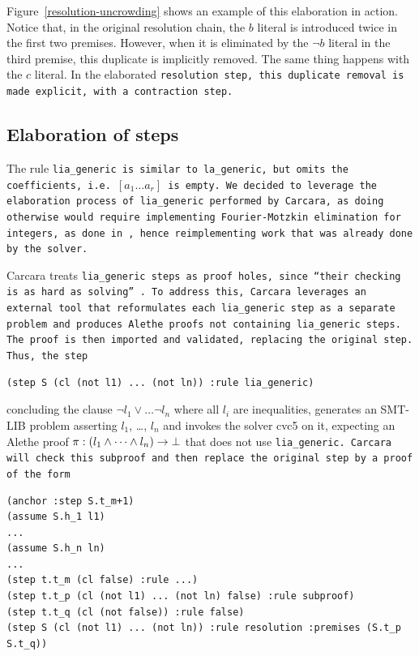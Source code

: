 Figure~\ref{resolution-uncrowding} shows an example of this elaboration in action.
Notice that, in the original resolution chain, the $b$ literal is introduced twice in the first two premises.
However, when it is eliminated by the $\neg b$ literal in the third premise, this duplicate is implicitly removed.
The same thing happens with the $c$ literal. In the elaborated \tt{resolution} step, this duplicate removal is made explicit, with a \tt{contraction} step.



\subsection{Elaboration of  steps}
\label{ssec:elaboration-lia}

The rule \tt{lia\_generic} is similar to \tt{la\_generic}, but omits the coefficients,
i.e.\ \colorbox{rxpink!30}{$[a_1 \dots a_r]$} is empty.
We decided to leverage the elaboration process of \tt{lia\_generic} performed by Carcara, as doing otherwise would require implementing Fourier-Motzkin elimination for integers, as done in \cite{micromega,omegatest}, hence reimplementing work that was already done by the solver.

Carcara treats \tt{lia\_generic} steps as proof holes, since ``their checking is as hard as solving''~\cite[\S 3.2]{carcara}.
To address this, Carcara leverages an external tool that reformulates each \tt{lia\_generic} step as a separate problem and produces Alethe proofs not containing \tt{lia\_generic} steps.
The proof is then imported and validated, replacing the original step.
Thus, the step
%
\begin{lstlisting}[language=SMT, frame=none, numbers=none]
    (step S (cl (not l1) ... (not ln)) :rule lia_generic)
\end{lstlisting}
%
concluding the clause $\neg l_1 \lor \dots \neg l_n$ where all $l_i$ are inequalities, generates an SMT-LIB problem asserting $l_1$, \dots, $l_n$ and invokes the solver cvc5 on it, expecting an Alethe proof $\pi : (l_1 \land \dots \land l_n) \rightarrow \bot$
that does not use \tt{lia\_generic}. Carcara will check this subproof and then replace the original step by a proof of the form

\begin{lstlisting}[language=SMT,caption={Elaboration of \kw{lia\_generic}},label={lst:elab_lia}]
(anchor :step S.t_m+1)
(assume S.h_1 l1)
...
(assume S.h_n ln)
...
(step t.t_m (cl false) :rule ...)
(step t.t_p (cl (not l1) ... (not ln) false) :rule subproof)
(step t.t_q (cl (not false)) :rule false)
(step S (cl (not l1) ... (not ln)) :rule resolution :premises (S.t_p S.t_q))
\end{lstlisting}

